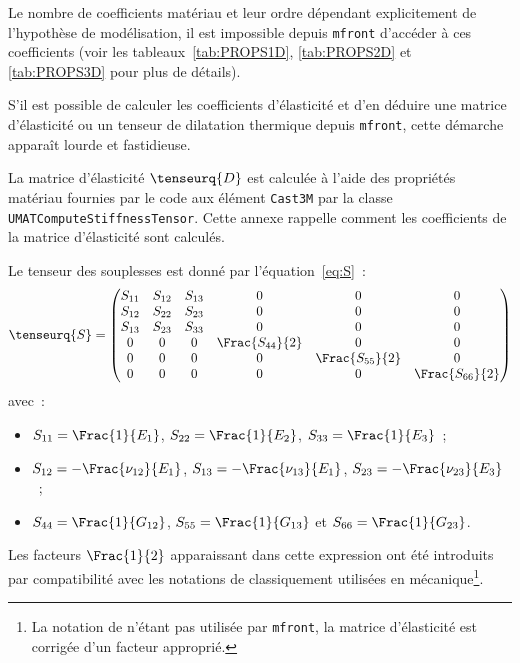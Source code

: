 \documentclass[rectoverso,pleiades,pstricks,leqno,anti]{texmf/note_technique_2010}
\newcommand{\mfront}{\texttt{mfront}}
\newcommand{\castem}{\texttt{Cast3M}}
\begin{document}
Le nombre de coefficients matériau et leur ordre dépendant
explicitement de l'hypothèse de modélisation, il est impossible depuis
\mfront{} d'accéder à ces coefficients (voir les
tableaux~\ref{tab:PROPS1D}, \ref{tab:PROPS2D} et \ref{tab:PROPS3D}
pour plus de détails).

S'il est possible de calculer les coefficients d'élasticité et d'en
déduire une matrice d'élasticité ou un tenseur de dilatation thermique
depuis \mfront{}, cette démarche apparaît lourde et fastidieuse.

La matrice d'élasticité \(\tenseurq{D}\) est calculée à l'aide des
propriétés matériau fournies par le code aux élément \castem{} par la
classe {\tt UMAT\-Compute\-Stiff\-ness\-Tensor}. Cette annexe rappelle
comment les coefficients de la matrice d'élasticité sont calculés.

Le tenseur des souplesses est donné par l'équation~\eqref{eq:S}~:
\[
\tenseurq{S}=
\begin{pmatrix}
  S_{11} & S_{12} & S_{13} & 0 & 0 & 0 \\
  S_{12} & S_{22} & S_{23} & 0 & 0 & 0 \\
  S_{13} & S_{23} & S_{33} & 0 & 0 & 0 \\
  0 & 0 & 0 & \Frac{S_{44}}{2} & 0  & 0 \\
  0 & 0 & 0 & 0               & \Frac{S_{55}}{2} & 0 \\
  0 & 0 & 0 & 0               & 0 & \Frac{S_{66}}{2} \\
\end{pmatrix}
\]
avec~:
\begin{minipage}[t]{0.8\linewidth}
  \begin{itemize}
  \item \(S_{11} = \Frac{1}{E_{1}}\), \(S_{22} = \Frac{1}{E_{2}}\), \(S_{33} = \Frac{1}{E_{3}}\)~;
  \item \(S_{12} = -\Frac{\nu_{12}}{E_{1}}\), \(S_{13} = -\Frac{\nu_{13}}{E_{1}}\), \(S_{23} = -\Frac{\nu_{23}}{E_{3}}\)~;
  \item \(S_{44} = \Frac{1}{G_{12}}\),  \(S_{55} = \Frac{1}{G_{13}}\) et \(S_{66} = \Frac{1}{G_{23}}\).
  \end{itemize}
\end{minipage}

Les facteurs \(\Frac{1}{2}\) apparaissant dans cette expression ont
été introduits par compatibilité avec les notations de 
classiquement utilisées en mécanique\footnote{La notation de
   n'étant pas utilisée par \mfront{}, la matrice
  d'élasticité est corrigée d'un facteur approprié.}.
\end{document}
